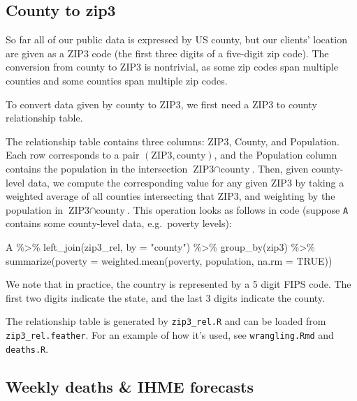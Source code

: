 \documentclass[
]{article}
\newenvironment{Shaded}{\begin{snugshade}}{\end{snugshade}}
\newcommand{\AttributeTok}[1]{\textcolor[rgb]{0.77,0.63,0.00}{#1}}
\newcommand{\ConstantTok}[1]{\textcolor[rgb]{0.00,0.00,0.00}{#1}}
\newcommand{\FunctionTok}[1]{\textcolor[rgb]{0.00,0.00,0.00}{#1}}
\newcommand{\NormalTok}[1]{#1}
\newcommand{\SpecialCharTok}[1]{\textcolor[rgb]{0.00,0.00,0.00}{#1}}
\newcommand{\StringTok}[1]{\textcolor[rgb]{0.31,0.60,0.02}{#1}}
\begin{document}
\hypertarget{county-to-zip3}{%
\subsection{County to zip3}\label{county-to-zip3}}

So far all of our public data is expressed by US county, but our
clients' location are given as a ZIP3 code (the first three digits of a
five-digit zip code). The conversion from county to ZIP3 is nontrivial,
as some zip codes span multiple counties and some counties span multiple
zip codes.

To convert data given by county to ZIP3, we first need a ZIP3 to county
relationship table.

The relationship table contains three columns: ZIP3, County, and
Population. Each row corresponds to a pair
\((\text{ZIP3}, \text{county})\), and the Population column contains the
population in the intersection \(\text{ZIP3} \cap \text{county}\). Then,
given county-level data, we compute the corresponding value for any
given ZIP3 by taking a weighted average of all counties intersecting
that ZIP3, and weighting by the population in
\(\text{ZIP3} \cap \text{county}\). This operation looks as follows in
code (suppose \texttt{A} contains some county-level data, e.g.~poverty
levels):

\begin{Shaded}
\begin{Highlighting}[]
\NormalTok{A }\SpecialCharTok{\%\textgreater{}\%}
  \FunctionTok{left\_join}\NormalTok{(zip3\_rel, }\AttributeTok{by =} \StringTok{"county"}\NormalTok{) }\SpecialCharTok{\%\textgreater{}\%}
  \FunctionTok{group\_by}\NormalTok{(zip3) }\SpecialCharTok{\%\textgreater{}\%}
  \FunctionTok{summarize}\NormalTok{(}\AttributeTok{poverty =} \FunctionTok{weighted.mean}\NormalTok{(poverty, population, }\AttributeTok{na.rm =} \ConstantTok{TRUE}\NormalTok{))}
\end{Highlighting}
\end{Shaded}

We note that in practice, the country is represented by a 5 digit FIPS
code. The first two digits indicate the state, and the last 3 digits
indicate the county.

The relationship table is generated by \texttt{zip3\_rel.R} and can be
loaded from \texttt{zip3\_rel.feather}. For an example of how it's used,
see \texttt{wrangling.Rmd} and \texttt{deaths.R}.

\hypertarget{weekly-deaths-ihme-forecasts}{%
\subsection{Weekly deaths \& IHME
forecasts}\label{weekly-deaths-ihme-forecasts}}
\end{document}
